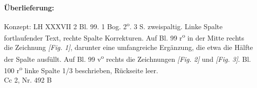       
               
                \begin{ledgroupsized}[r]{120mm}
                \footnotesize 
                \pstart                
                \noindent\textbf{\"{U}berlieferung:}   
                \pend
                \end{ledgroupsized}
            
              
                            \begin{ledgroupsized}[r]{114mm}
                            \footnotesize 
                            \pstart \parindent -6mm
                            Konzept: LH XXXVII 2 Bl. 99. 1 Bog. 2\textsuperscript{o}. 3 S. zweispaltig. Linke Spalte fortlaufender Text, rechte Spalte Korrekturen. Auf Bl. 99 r\textsuperscript{o} in der Mitte rechts die Zeichnung \textit{[Fig. 1]}, darunter eine umfangreiche Erg\"{a}nzung, die etwa die H\"{a}lfte der Spalte ausf\"{u}llt. Auf Bl. 99 v\textsuperscript{o} rechts die Zeichnungen \textit{[Fig. 2]} und \textit{[Fig. 3]}. Bl. 100 r\textsuperscript{o} linke Spalte 1/3 beschrieben, R\"{u}ckseite leer.\\Cc 2, Nr. 492 B \pend
                            \end{ledgroupsized}
                \vspace*{8mm}
                \pstart 
                \normalsize
